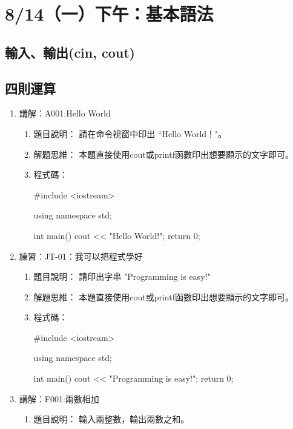 \section{8/14（一）下午：基本語法}

	\subsection{輸入、輸出(cin, cout)}
	\subsection{四則運算}
	
\begin{enumerate}
	\item 講解︰A001:Hello World
	\begin{enumerate}
	\item 題目說明：
	\subitem 請在命令視窗中印出 ``Hello World！"。
	
	\item 解題思維：
	\subitem 本題直接使用cout或printf函數印出想要顯示的文字即可。
	
	\item 程式碼：
	\begin{cppcode}
		#include <iostream>
		
		using namespace std;
		
		int main()
		{
			cout << "Hello World!";
			return 0;
		}
	\end{cppcode}
	\end{enumerate}
	
	\item 練習︰JT-01︰我可以把程式學好
		\begin{enumerate}
			\item 題目說明：
			\subitem 請印出字串 "Programming is easy!"
			
			\item 解題思維：
			\subitem 本題直接使用cout或printf函數印出想要顯示的文字即可。
			
			\item 程式碼：
			\begin{cppcode}
				#include <iostream>
				
				using namespace std;
				
				int main()
				{
					cout << "Programming is easy!";
					return 0;
				}
				
			\end{cppcode}
		\end{enumerate}
	\item 講解︰F001:兩數相加%
		\begin{enumerate}
			\item 題目說明：
			\subitem 輸入兩整數，輸出兩數之和。
			

\end{enumerate}
\end{enumerate}
